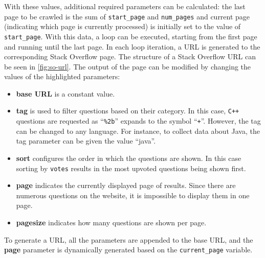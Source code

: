 \documentclass[12pt,a4paper]{article}
\begin{document}
With these values, additional required parameters can be calculated: the last page to be crawled is the sum of \texttt{start\_page} and \texttt{num\_pages} and current page (indicating which page is currently processed) is initially set to the value of \texttt{start\_page}. With this data, a loop can be executed, starting from the first page and running until the last page. In each loop iteration, a URL is generated to the corresponding Stack Overflow page. The structure of a Stack Overflow URL can be seen in \cref{fig:so-url}. The output of the page can be modified by changing the values of the highlighted parameters:
\begin{itemize}
	\item \textbf{base URL} is a constant value.
	\item \textbf{tag} is used to filter questions based on their category. In this case, \texttt{C++} questions are requested as \enquote{\texttt{\%2b}} expands to the symbol \enquote{\texttt{+}}. However, the tag can be changed to any language. For instance, to collect data about Java, the tag parameter can be given the value \enquote{java}.
	\item \textbf{sort} configures the order in which the questions are shown. In this case sorting by \texttt{votes} results in the most upvoted questions being shown first.
	\item \textbf{page} indicates the currently displayed page of results. Since there are numerous questions on the website, it is impossible to display them in one page.
	\item \textbf{pagesize} indicates how many questions are shown per page.
\end{itemize}

To generate a URL, all the parameters are appended to the base URL, and the \textbf{page} parameter is dynamically generated based on the \texttt{current\_page} variable.
\end{document}
